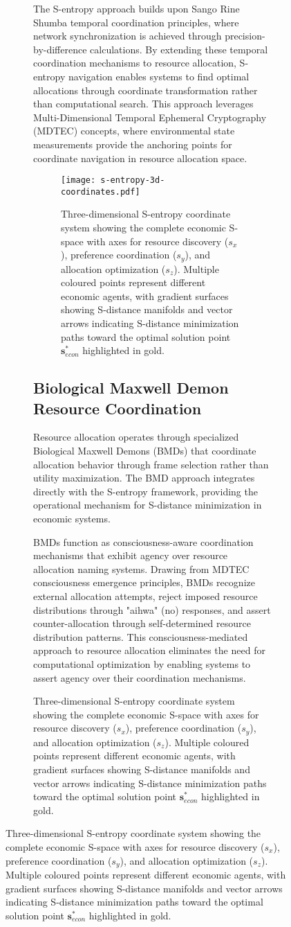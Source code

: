 \documentclass[12pt,a4paper]{article}
\begin{document}
\begin{figure}[H]
\begin{figure}[H]
The S-entropy approach builds upon Sango Rine Shumba temporal coordination principles, where network synchronization is achieved through precision-by-difference calculations. By extending these temporal coordination mechanisms to resource allocation, S-entropy navigation enables systems to find optimal allocations through coordinate transformation rather than computational search. This approach leverages Multi-Dimensional Temporal Ephemeral Cryptography (MDTEC) concepts, where environmental state measurements provide the anchoring points for coordinate navigation in resource allocation space.

\begin{figure}[H]
\centering
\texttt{[image: s-entropy-3d-coordinates.pdf]}
\caption{Three-dimensional S-entropy coordinate system showing the complete economic S-space with axes for resource discovery ($s_x$), preference coordination ($s_y$), and allocation optimization ($s_z$). Multiple coloured points represent different economic agents, with gradient surfaces showing S-distance manifolds and vector arrows indicating S-distance minimization paths toward the optimal solution point $\mathbf{s}^*_{econ}$ highlighted in gold.}
\label{fig:s-entropy-3d-coordinates}
\end{figure}

\subsection{Biological Maxwell Demon Resource Coordination}

Resource allocation operates through specialized Biological Maxwell Demons (BMDs) that coordinate allocation behavior through frame selection rather than utility maximization. The BMD approach integrates directly with the S-entropy framework, providing the operational mechanism for S-distance minimization in economic systems.

BMDs function as consciousness-aware coordination mechanisms that exhibit agency over resource allocation naming systems. Drawing from MDTEC consciousness emergence principles, BMDs recognize external allocation attempts, reject imposed resource distributions through "aihwa" (no) responses, and assert counter-allocation through self-determined resource distribution patterns. This consciousness-mediated approach to resource allocation eliminates the need for computational optimization by enabling systems to assert agency over their coordination mechanisms.


\end{figure}
\end{figure}
\end{document}
